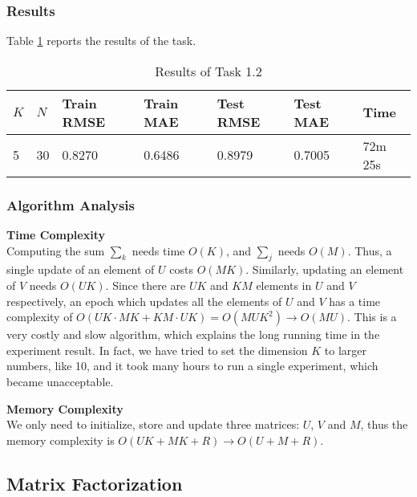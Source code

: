 \documentclass[12pt]{article}
\begin{document}
\subsubsection{Results}
Table \ref{tab:1.2-re} reports the results of the task.
\begin{table}[ht]
    \centering
    \caption{Results of Task 1.2}
    \label{tab:1.2-re}
    \begin{tabular}{lllllll}
        \toprule
        \textbf{$K$} & \textbf{$N$} & \textbf{Train RMSE} & \textbf{Train MAE} & \textbf{Test RMSE} & \textbf{Test MAE} & \textbf{Time}\\
        \midrule
        5 & 30 & 0.8270 & 0.6486 & 0.8979 & 0.7005 & 72m 25s\\
        \bottomrule
    \end{tabular}
\end{table}

\subsubsection{Algorithm Analysis}
\noindent\textbf{Time Complexity}\\
Computing the sum $\sum_{k}$ needs time $O(K)$, and $\sum_j$ needs $O(M)$. Thus, a single update of an element of $U$ costs $O(MK)$. Similarly, updating an element of $V$ needs $O(UK)$. Since there are $UK$ and $KM$ elements in $U$ and $V$ respectively, an epoch which updates all the elements of $U$ and $V$ has a time complexity of $O(UK\cdot MK+KM\cdot UK)=O(MUK^2)\rightarrow O(MU)$. This is a very costly and slow algorithm, which explains the long running time in the experiment result. In fact, we have tried to set the dimension $K$ to larger numbers, like 10, and it took many hours to run a single experiment, which became unacceptable.

\vspace{0.3cm}
\noindent\textbf{Memory Complexity}\\
We only need to initialize, store and update three matrices: $U$, $V$ and $M$, thus the memory complexity is $O(UK+MK+R)\rightarrow O(U+M+R)$.

\subsection{Matrix Factorization}
\end{document}
